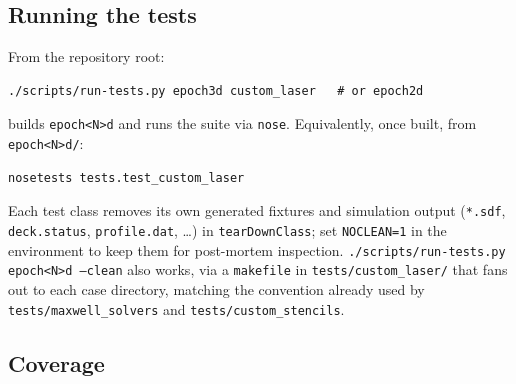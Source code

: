 \documentclass[11pt,a4paper]{article}
\begin{document}
\subsection{Running the tests}

From the repository root:

\begin{lstlisting}[style=deck]
./scripts/run-tests.py epoch3d custom_laser   # or epoch2d
\end{lstlisting}

builds \texttt{epoch<N>d} and runs the suite via \texttt{nose}.
Equivalently, once built, from \texttt{epoch<N>d/}:

\begin{lstlisting}[style=deck]
nosetests tests.test_custom_laser
\end{lstlisting}

Each test class removes its own generated fixtures and simulation
output (\texttt{*.sdf}, \texttt{deck.status}, \texttt{profile.dat},
\ldots) in \texttt{tearDownClass}; set \texttt{NOCLEAN=1} in the
environment to keep them for post-mortem inspection.
\texttt{./scripts/run-tests.py epoch<N>d --clean} also works, via a
\texttt{makefile} in \texttt{tests/custom\_laser/} that fans out to
each case directory, matching the convention already used by
\texttt{tests/maxwell\_solvers} and \texttt{tests/custom\_stencils}.

\subsection{Coverage}
\end{document}
